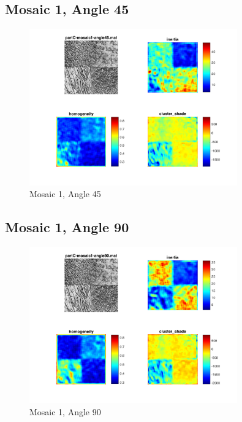 \documentclass[a4paper,12pt,titlepage]{article}
\begin{document}
\subsection{Mosaic 1, Angle 45}
\begin{figure}[H]
\includegraphics[width=0.8\textwidth]{partC-mosaic1-angle45}
\caption{Mosaic 1, Angle 45}
\label{fig:Mosaic1Angle45}
\end{figure}

\subsection{Mosaic 1, Angle 90}
\begin{figure}[H]
\includegraphics[width=0.8\textwidth]{partC-mosaic1-angle90}
\caption{Mosaic 1, Angle 90}
\label{fig:Mosaic1Angle90}
\end{figure}

\end{document}
